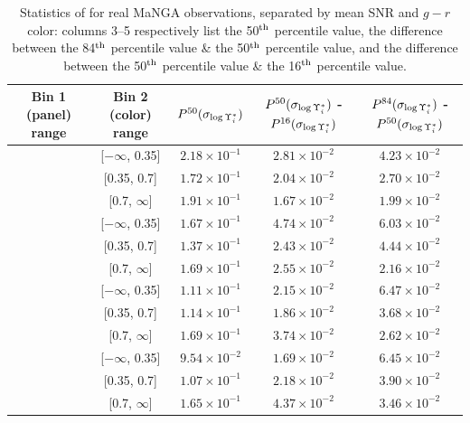 \begin{table}[p]
    \centering
    \begin{tabular}{||c|c|c|c|c||} \hline \hline
        Bin 1 (panel) range & Bin 2 (color) range & $P^{50}(\sigma_{\log \Upsilon^*_{i}})$ & $P^{50}(\sigma_{\log \Upsilon^*_{i}})$  - $P^{16}(\sigma_{\log \Upsilon^*_{i}})$ & $P^{84}(\sigma_{\log \Upsilon^*_{i}})$ - $P^{50}(\sigma_{\log \Upsilon^*_{i}})$ \\ \hline \hline
        [$-\infty$, 2.0] & [$-\infty$, 0.35] & $2.18 \times 10^{-1}$ & $2.81 \times 10^{-2}$ & $4.23 \times 10^{-2}$ \\ \hline
        [$-\infty$, 2.0] & [0.35, 0.7] & $1.72 \times 10^{-1}$ & $2.04 \times 10^{-2}$ & $2.70 \times 10^{-2}$ \\ \hline
        [$-\infty$, 2.0] & [0.7, $\infty$] & $1.91 \times 10^{-1}$ & $1.67 \times 10^{-2}$ & $1.99 \times 10^{-2}$ \\ \hline
        [2.0, 10.0] & [$-\infty$, 0.35] & $1.67 \times 10^{-1}$ & $4.74 \times 10^{-2}$ & $6.03 \times 10^{-2}$ \\ \hline
        [2.0, 10.0] & [0.35, 0.7] & $1.37 \times 10^{-1}$ & $2.43 \times 10^{-2}$ & $4.44 \times 10^{-2}$ \\ \hline
        [2.0, 10.0] & [0.7, $\infty$] & $1.69 \times 10^{-1}$ & $2.55 \times 10^{-2}$ & $2.16 \times 10^{-2}$ \\ \hline
        [10.0, 20.0] & [$-\infty$, 0.35] & $1.11 \times 10^{-1}$ & $2.15 \times 10^{-2}$ & $6.47 \times 10^{-2}$ \\ \hline
        [10.0, 20.0] & [0.35, 0.7] & $1.14 \times 10^{-1}$ & $1.86 \times 10^{-2}$ & $3.68 \times 10^{-2}$ \\ \hline
        [10.0, 20.0] & [0.7, $\infty$] & $1.69 \times 10^{-1}$ & $3.74 \times 10^{-2}$ & $2.62 \times 10^{-2}$ \\ \hline
        [20.0, $\infty$] & [$-\infty$, 0.35] & $9.54 \times 10^{-2}$ & $1.69 \times 10^{-2}$ & $6.45 \times 10^{-2}$ \\ \hline
        [20.0, $\infty$] & [0.35, 0.7] & $1.07 \times 10^{-1}$ & $2.18 \times 10^{-2}$ & $3.90 \times 10^{-2}$ \\ \hline
        [20.0, $\infty$] & [0.7, $\infty$] & $1.65 \times 10^{-1}$ & $4.37 \times 10^{-2}$ & $3.46 \times 10^{-2}$ \\ \hline
    \end{tabular}
    \caption[Statistics of  for real MaNGA observations, separated by mean SNR and $g - r$ color]{\fixspacing Statistics of  for real MaNGA observations, separated by mean SNR and $g - r$ color: columns 3--5 respectively list the 50$^{\rm th}$ percentile value, the difference between the 84$^{\rm th}$ percentile value \& the 50$^{\rm th}$ percentile value, and the difference between the 50$^{\rm th}$ percentile value \& the 16$^{\rm th}$ percentile value.}
    \label{tab:obs_snr_color_widMLi}
\end{table}

